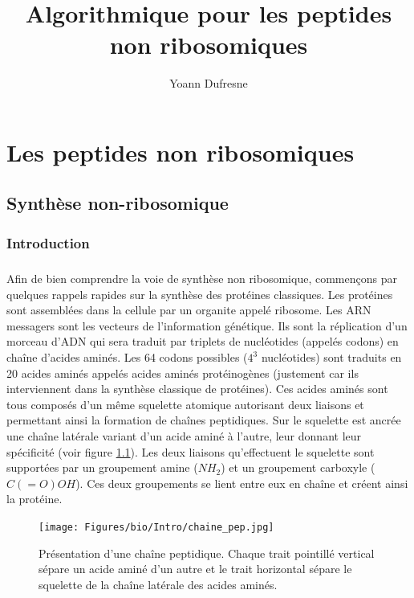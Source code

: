 \documentclass[12pt,french,twoside]{report}
\title{Algorithmique pour les peptides non ribosomiques}
\author{Yoann Dufresne}
\begin{document}
\maketitle
\tableofcontents

\chapter{Les peptides non ribosomiques}

\section{Synthèse non-ribosomique}

\subsection{Introduction}

\paragraph{}Afin de bien comprendre la voie de synthèse non ribosomique, commençons par quelques rappels rapides sur la synthèse des protéines classiques.
Les protéines sont assemblées dans la cellule par un organite appelé ribosome.
Les ARN messagers sont les vecteurs de l'information génétique.
Ils sont la réplication d'un morceau d'ADN qui sera traduit par triplets de nucléotides (appelés codons) en chaîne d'acides aminés.
Les 64 codons possibles ($4^3$ nucléotides) sont traduits en 20 acides aminés appelés acides aminés protéinogènes (justement car ils interviennent dans la synthèse classique de protéines).
Ces acides aminés sont tous composés d'un même squelette atomique autorisant deux liaisons et permettant ainsi la formation de chaînes peptidiques.
Sur le squelette est ancrée une chaîne latérale variant d'un acide aminé à l'autre, leur donnant leur spécificité (voir figure \ref{chaine_pep}).
Les deux liaisons qu'effectuent le squelette sont supportées par un groupement amine ($NH_2$) et un groupement carboxyle ($C(=O)OH$).
Ces deux groupements se lient entre eux en chaîne et créent ainsi la protéine.

\begin{figure}[h!]
  \begin{center}
    \texttt{[image: Figures/bio/Intro/chaine\_pep.jpg]}
    \caption{\label{chaine_pep}Présentation d'une chaîne peptidique.
    Chaque trait pointillé vertical sépare un acide aminé d'un autre et le trait horizontal sépare le squelette de la chaîne latérale des acides aminés.}
  \end{center}
\end{figure}
\end{document}
